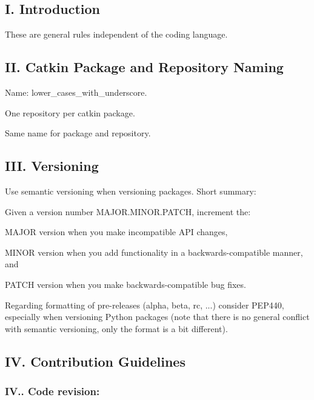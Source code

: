 \subsection*{I. Introduction}

These are general rules independent of the coding language.

\subsection*{II. Catkin Package and Repository Naming}


\begin{DoxyItemize}
\item Name\+: lower\+\_\+cases\+\_\+with\+\_\+underscore.
\item One repository per catkin package.
\item Same name for package and repository.
\end{DoxyItemize}

\subsection*{I\+II. Versioning}

Use semantic versioning when versioning packages. Short summary\+:


\begin{DoxyItemize}
\item Given a version number M\+A\+J\+O\+R.\+M\+I\+N\+O\+R.\+P\+A\+T\+CH, increment the\+:
\item M\+A\+J\+OR version when you make incompatible A\+PI changes,
\item M\+I\+N\+OR version when you add functionality in a backwards-\/compatible manner, and
\item P\+A\+T\+CH version when you make backwards-\/compatible bug fixes.
\end{DoxyItemize}

Regarding formatting of pre-\/releases (alpha, beta, rc, ...) consider P\+E\+P440, especially when versioning Python packages (note that there is no general conflict with semantic versioning, only the format is a bit different).

\subsection*{IV. Contribution Guidelines}

\subsubsection*{I\+V.. Code revision\+:}

